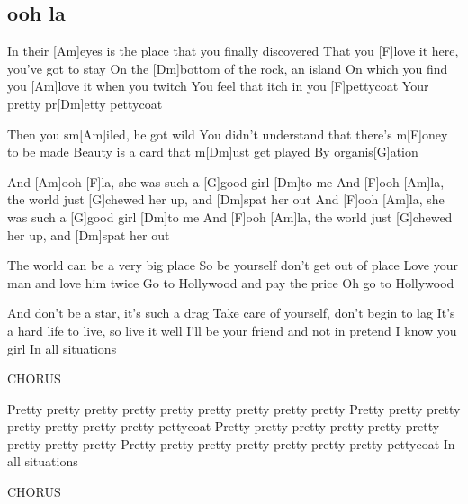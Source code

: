 \subsection*{ooh la   }
\begin{guitar}
In their [Am]eyes is the place that you finally discovered
That you [F]love it here, you've got to stay
On the [Dm]bottom of the rock, an island
On which you find you [Am]love it when you twitch
You feel that itch in you [F]pettycoat
Your pretty pr[Dm]etty pettycoat



Then you sm[Am]iled, he got wild
You didn't understand that there's m[F]oney to be made
Beauty is a card that m[Dm]ust get played
By organis[G]ation



And [Am]ooh [F]la, she was such a [G]good girl [Dm]to me
And [F]ooh [Am]la, the world just [G]chewed her up, and [Dm]spat her out
And [F]ooh [Am]la, she was such a [G]good girl [Dm]to me
And [F]ooh [Am]la, the world just [G]chewed her up, and [Dm]spat her out



The world can be a very big place
So be yourself don't get out of place
Love your man and love him twice
Go to Hollywood and pay the price
Oh go to Hollywood



And don't be a star, it's such a drag
Take care of yourself, don't begin to lag
It's a hard life to live, so live it well
I'll be your friend and not in pretend
I know you girl
In all situations



CHORUS



Pretty pretty pretty pretty pretty pretty pretty pretty pretty
Pretty pretty pretty pretty pretty pretty pretty pettycoat
Pretty pretty pretty pretty pretty pretty pretty pretty pretty
Pretty pretty pretty pretty pretty pretty pretty pettycoat
In all situations



CHORUS
\end{guitar}
